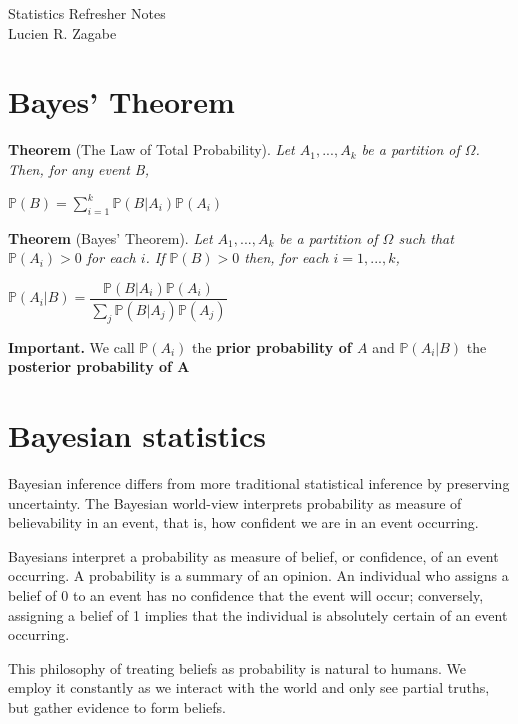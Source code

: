 \documentclass[11pt,a4paper]{report}
\begin{document}
\begin{center}
  {\large Statistics Refresher Notes}\\[.5cm]
  {\small Lucien R. Zagabe}\\[1cm]
\end{center}

\section*{Bayes' Theorem}

\noindent \textbf{Theorem} (The Law of Total Probability). \emph{Let
  $A_1,...,A_k$ be a partition of $\Omega$. Then, for any event B, }
\begin{center}
  $\mathbb{P}(B) = \sum_{i = 1}^{k} \mathbb{P}(B | A_i)\mathbb{P}(A_i)$
\end{center}

\noindent \textbf{Theorem} (Bayes' Theorem). \emph{Let $A_1,...,A_k$
  be a partition of $\Omega$ such that $\mathbb{P}(A_i) > 0$
  for each $i$. If $\mathbb{P}(B) > 0$ then, for each $i = 1,...,k$,}
\begin{center}
  $\mathbb{P}(A_i|B) =
  \dfrac{\mathbb{P}(B|A_i)\mathbb{P}(A_i)}{\sum_{j}\mathbb{P}(B|A_j)\mathbb{P}(A_j)}$ 
\end{center}

\noindent \textbf{Important.} We call $\mathbb{P}(A_i)$ the \textbf{prior
  probability of $A$} and $\mathbb{P}(A_i|B)$ the \textbf{posterior
  probability of A}

\section*{Bayesian statistics}

Bayesian inference differs from more traditional statistical inference
by preserving uncertainty. The Bayesian world-view interprets
probability as measure of believability in an event, that is, how
confident we are in an event occurring.

Bayesians interpret a probability as measure of belief, or confidence,
of an event occurring. A probability is a summary of an opinion. An
individual who assigns a belief of 0 to an event has no confidence
that the event will occur; conversely, assigning a belief of 1 implies
that the individual is absolutely certain of an event occurring.

This philosophy of treating beliefs as probability is natural to
humans. We employ it constantly as we interact with the world and only
see partial truths, but gather evidence to form beliefs.
\end{document}
